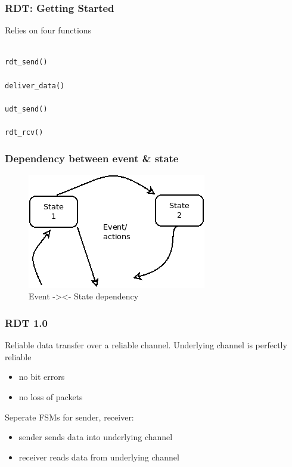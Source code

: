 \documentclass[11pt]{article}
\begin{document}
\subsubsection{RDT: Getting Started}
\label{sec:org65fb2d5}

Relies on four functions

\begin{verbatim}

rdt_send()

deliver_data()

udt_send()

rdt_rcv()

\end{verbatim}


\subsubsection{Dependency between event \& state}
\label{sec:orgd7bbe53}

\begin{figure}[htbp]
\centering
\includegraphics[width=.9\linewidth]{../img/eventStateDependency.png}
\caption{Event -><- State dependency}
\end{figure}


\subsubsection{RDT 1.0}
\label{sec:org72a0dde}
Reliable data transfer over a reliable channel. Underlying channel is
perfectly reliable
\begin{itemize}
\item no bit errors
\item no loss of packets
\end{itemize}

Seperate FSMs for sender, receiver:
\begin{itemize}
\item sender sends data into underlying channel
\item receiver reads data from underlying channel
\end{itemize}
\end{document}
